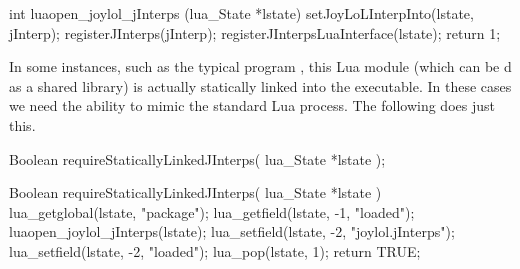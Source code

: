 \startCCode
int luaopen_joylol_jInterps (lua_State *lstate) {
  setJoyLoLInterpInto(lstate, jInterp);
  registerJInterps(jInterp);
  registerJInterpsLuaInterface(lstate);
  return 1;
}
\stopCCode

In some instances, such as the typical  program 
, this Lua module (which can be d as a 
shared library) is actually statically linked into the executable. In 
these cases we need the ability to mimic the standard Lua  
process. The following  does just this. 

\startCHeader
Boolean requireStaticallyLinkedJInterps(
  lua_State *lstate
);
\stopCHeader

\startCCode
Boolean requireStaticallyLinkedJInterps(
  lua_State *lstate
) {
  lua_getglobal(lstate, "package");
  lua_getfield(lstate, -1, "loaded");
  luaopen_joylol_jInterps(lstate);
  lua_setfield(lstate, -2, "joylol.jInterps");
  lua_setfield(lstate, -2, "loaded");
  lua_pop(lstate, 1);
  return TRUE;
}
\stopCCode
